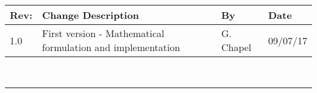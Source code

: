 \documentclass[]{BasiliskReportMemo}
\begin{document}
\makeCover

%
%
\pagestyle{empty}
{\renewcommand{\arraystretch}{2}
	\noindent
	\begin{longtable}{|p{0.3in}|p{4.01in}|p{.94in}|p{0.7in}|}
		\hline
		{\bfseries Rev}: & {\bfseries Change Description} & {\bfseries By} & {\bfseries Date} \\
		\hline
		1.0 & First version - Mathematical formulation and implementation & G. Chapel & 09/07/17\\
		\hline
		
	\end{longtable}
}

\newpage
\setcounter{page}{1}
\pagestyle{fancy}

\tableofcontents %
~\\ \hrule ~\\ %
	




%
\end{document}
